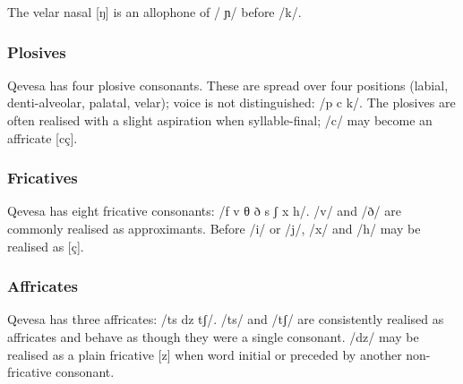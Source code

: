 \documentclass[grammar]{subfiles}
\begin{document}
  The velar nasal [ŋ] is an allophone of / ɲ/ before /k/.

  \subsubsection{Plosives}
  \label{sssec:plosives}

  Qevesa has four plosive consonants.  These are spread over four positions
  (labial, denti-alveolar, palatal, velar); voice is not distinguished: /p
   c k/.  The plosives are often realised with a slight aspiration when
  syllable-final; /c/ may become an affricate [cç].  
  

  \subsubsection{Fricatives}
  \label{sssec:fricatives}

  Qevesa has eight fricative consonants: /f v θ ð s ʃ x h/.  /v/ and /ð/ are
  commonly realised as approximants. Before /i/ or /j/, /x/ and /h/ may be
  realised as [ç].
% 

  \subsubsection{Affricates}
  \label{sssec:affricates}

  Qevesa has three affricates: /ts dz tʃ/. /ts/ and /tʃ/ are consistently
  realised as affricates and behave as though they were a single consonant.
  /dz/ may be realised as a plain fricative [z] when word initial or preceded
  by another non-fricative consonant.

\end{document}
